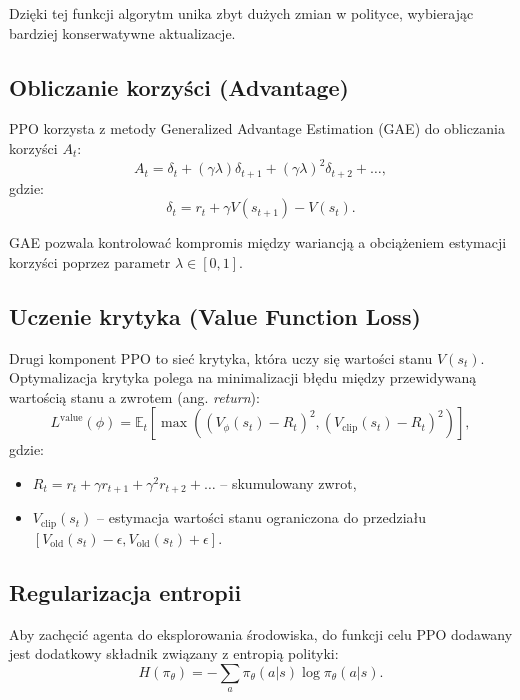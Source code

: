 \documentclass[conference]{IEEEtran}
\begin{document}
Dzięki tej funkcji algorytm unika zbyt dużych zmian w polityce, wybierając bardziej konserwatywne aktualizacje.

\subsection{Obliczanie korzyści (Advantage)}
PPO korzysta z metody Generalized Advantage Estimation (GAE) do obliczania korzyści \(A_t\):
\begin{equation}
A_t = \delta_t + (\gamma \lambda) \delta_{t+1} + (\gamma \lambda)^2 \delta_{t+2} + \ldots,
\end{equation}
gdzie:
\begin{equation}
\delta_t = r_t + \gamma V(s_{t+1}) - V(s_t).
\end{equation}

GAE pozwala kontrolować kompromis między wariancją a obciążeniem estymacji korzyści poprzez parametr \(\lambda \in [0, 1]\).

\subsection{Uczenie krytyka (Value Function Loss)}
Drugi komponent PPO to sieć krytyka, która uczy się wartości stanu \(V(s_t)\). Optymalizacja krytyka polega na minimalizacji błędu między przewidywaną wartością stanu a zwrotem (ang. \textit{return}):
\begin{equation}
L^\text{value}(\phi) = \mathbb{E}_t \left[ \max \left( (V_\phi(s_t) - R_t)^2, (V_\text{clip}(s_t) - R_t)^2 \right) \right],
\end{equation}
gdzie:
\begin{itemize}
    \item \(R_t = r_t + \gamma r_{t+1} + \gamma^2 r_{t+2} + \ldots\) – skumulowany zwrot,
    \item \(V_\text{clip}(s_t)\) – estymacja wartości stanu ograniczona do przedziału \([V_\text{old}(s_t) - \epsilon, V_\text{old}(s_t) + \epsilon]\).
\end{itemize}

\subsection{Regularizacja entropii}
Aby zachęcić agenta do eksplorowania środowiska, do funkcji celu PPO dodawany jest dodatkowy składnik związany z entropią polityki:
\begin{equation}
H(\pi_\theta) = -\sum_a \pi_\theta(a | s) \log \pi_\theta(a | s).
\end{equation}
\end{document}

